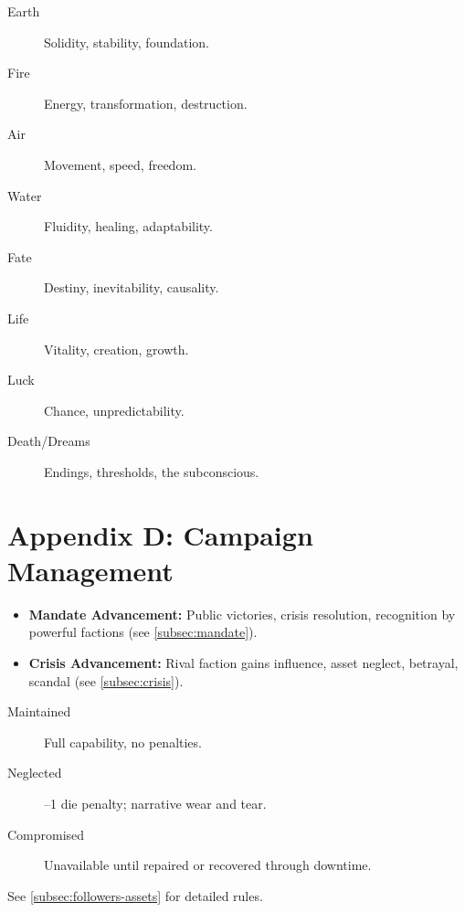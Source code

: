 \begin{tcolorbox}[title=Eight Elements of Magic, colback=white!97!gray, colframe=black!80!gray]
\begin{description}
  \item[Earth] Solidity, stability, foundation.
  \item[Fire] Energy, transformation, destruction.
  \item[Air] Movement, speed, freedom.
  \item[Water] Fluidity, healing, adaptability.
  \item[Fate] Destiny, inevitability, causality.
  \item[Life] Vitality, creation, growth.
  \item[Luck] Chance, unpredictability.
  \item[Death/Dreams] Endings, thresholds, the subconscious.
\end{description}
\end{tcolorbox}

\clearpage
\section*{Appendix D: Campaign Management}
\label{app:campaign}

\begin{tcolorbox}[title=Campaign Clock Examples, colback=white!97!gray, colframe=black!80!gray]
\begin{itemize}
  \item \textbf{Mandate Advancement:} Public victories, crisis resolution, recognition by powerful factions (see \ref{subsec:mandate}).
  \item \textbf{Crisis Advancement:} Rival faction gains influence, asset neglect, betrayal, scandal (see \ref{subsec:crisis}).
\end{itemize}
\end{tcolorbox}

\begin{tcolorbox}[title=Follower and Asset Condition States, colback=white!97!gray, colframe=black!80!gray]
\begin{description}
  \item[Maintained] Full capability, no penalties.
  \item[Neglected] –1 die penalty; narrative wear and tear.
  \item[Compromised] Unavailable until repaired or recovered through downtime.
\end{description}
See \ref{subsec:followers-assets} for detailed rules.
\end{tcolorbox}

